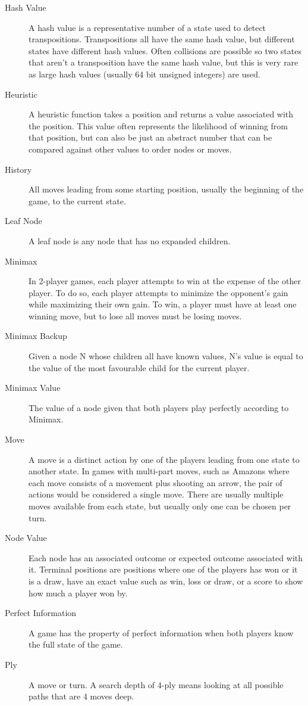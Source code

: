 \begin{description}
\item[Hash Value] A hash value is a representative number of a state used to detect transpositions. Transpositions all have the same hash value, but different states have different hash values. Often collisions are possible so two states that aren't a transposition have the same hash value, but this is very rare as large hash values (usually 64 bit unsigned integers) are used.
\item[Heuristic] A heuristic function takes a position and returns a value associated with the position. This value often represents the likelihood of winning from that position, but can also be just an abstract number that can be compared against other values to order nodes or moves.
\item[History] All moves leading from some starting position, usually the beginning of the game, to the current state.
\item[Leaf Node] A leaf node is any node that has no expanded children.
\item[Minimax] In 2-player games, each player attempts to win at the expense of the other player. To do so, each player attempts to minimize the opponent's gain while maximizing their own gain. To win, a player must have at least one winning move, but to lose all moves must be losing moves.
\item[Minimax Backup] Given a node N whose children all have known values, N's value is equal to the value of the most favourable child for the current player.
\item[Minimax Value] The value of a node given that both players play perfectly according to Minimax.
\item[Move] A move is a distinct action by one of the players leading from one state to another state. In games with multi-part moves, such as Amazons where each move consists of a movement plus shooting an arrow, the pair of actions would be considered a single move. There are usually multiple moves available from each state, but usually only one can be chosen per turn.
\item[Node Value] Each node has an associated outcome or expected outcome associated with it. Terminal positions are positions where one of the players has won or it is a draw, have an exact value such as win, loss or draw, or a score to show how much a player won by.
\item[Perfect Information] A game has the property of perfect information when both players know the full state of the game.
\item[Ply] A move or turn. A search depth of 4-ply means looking at all possible paths that are 4 moves deep.

\end{description}
